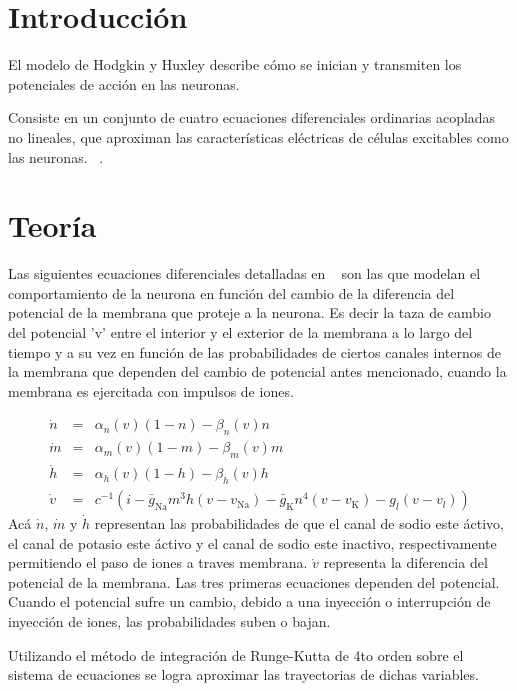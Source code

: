 \documentclass[aps,prl,twocolumn,groupedaddress]{revtex4-2}
\begin{document}
\section{Introducción}

El modelo de Hodgkin y Huxley describe cómo se inician y transmiten los potenciales de acción en las neuronas.

Consiste en un conjunto de cuatro ecuaciones diferenciales ordinarias acopladas no lineales, que aproximan las características eléctricas de células excitables como las neuronas.
~\cite{HodgkinyHuxleyWikipedia}.

\section{Teoría}

Las siguientes ecuaciones diferenciales
detalladas en ~\cite{HodgkinyHuxleyWikipedia} 
son las que modelan el comportamiento de la neurona en función del cambio de la diferencia del potencial de la membrana que proteje a la neurona. Es decir la taza de cambio del potencial 'v' entre el interior y el exterior de la membrana a lo largo del tiempo y a su vez en función de las probabilidades de ciertos canales internos de la membrana  que dependen del cambio de potencial antes mencionado, cuando la membrana es ejercitada con impulsos de iones.

\begin{eqnarray*}
\dot{n}&=&\alpha_n(v)(1-n)-\beta_n(v) n\\
\dot{m}&=&\alpha_m(v)(1-m)-\beta_m(v) m\\
\dot{h}&=&\alpha_h(v)(1-h)-\beta_h(v) h\\
\dot{v}&=&c^{-1}(i-\bar{g}_{\mathrm{Na}}m^3h(v-v_{\mathrm{Na}})-\bar{g}_{\mathrm{K}}n^4(v-v_{\mathrm{K}})-g_{l}(v-v_{l}))
\end{eqnarray*}
Acá $\dot{n}$, $\dot{m}$ y $\dot{h}$
representan las probabilidades de que el canal de sodio este áctivo, el canal de potasio este áctivo y el canal de sodio este inactivo, respectivamente permitiendo el paso de iones a traves membrana. $\dot{v}$ representa la diferencia del potencial de la membrana.
Las tres primeras ecuaciones dependen del potencial. Cuando el potencial sufre un cambio, debido a una inyección o interrupción de inyección de iones, las probabilidades suben o bajan.


Utilizando el método de integración de Runge-Kutta de 4to orden  sobre el sistema de ecuaciones se logra aproximar las trayectorias de dichas variables.
\end{document}
